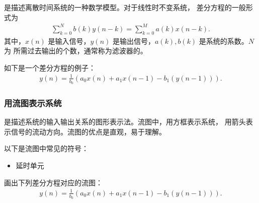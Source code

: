 \begin{definition}[差分方程]
    是描述离散时间系统的一种数学模型。对于线性时不变系统，
    差分方程的一般形式为
    \begin{align*}
        \sum_{k = 0}^{N}b(k)y(n - k) = \sum_{k = 0}^{M}a(k)x(n - k).
    \end{align*}
    其中，$x(n)$ 是输入信号，$y(n)$ 是输出信号，$a(k), b(k)$ 是系统的系数。$N$ 为
    所需过去输出的个数，通常称为滤波器的。
\end{definition}

\begin{example}
    如下是一个差分方程的例子：
    \begin{align*}
        y(n) = \frac{1}{b_0}(a_0x(n) + a_1x(n - 1) - b_1(y(n - 1))).
    \end{align*}
\end{example}

\subsubsection{用流图表示系统}

\label{subsubsection:flow-chart-representation}

\begin{definition}[流图]
    是描述系统的输入输出关系的图形表示法。流图中，用方框表示系统，
    用箭头表示信号的流动方向。流图的优点是直观，易于理解。

    以下是流图中常见的符号：
    \begin{itemize}
        \item 延时单元

    \end{itemize}
\end{definition}

\begin{exercise}
    画出下列差分方程对应的流图：
    \begin{align*}
        y(n) = \frac{1}{b_0}(a_0x(n) + a_1x(n - 1) - b_1(y(n - 1))).
    \end{align*}
\end{exercise}

